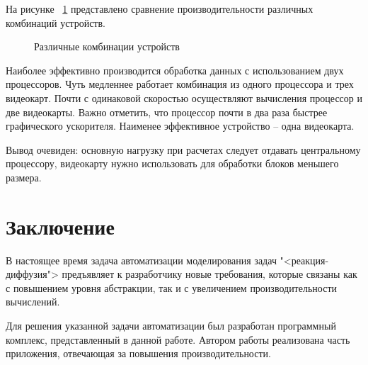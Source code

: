 \documentclass[a4paper, 14pt]{extarticle}
\theoremstyle{definition}
\begin{document}
\par На рисунке ~\ref{ris:hist} представлено сравнение производительности различных комбинаций устройств.
\begin{figure}[h]
	\caption{Различные комбинации устройств}
	\label{ris:hist}
\end{figure}

\par Наиболее эффективно производится обработка данных с использованием двух процессоров. Чуть медленнее работает комбинация из одного процессора и трех видеокарт. Почти с одинаковой скоростью осуществляют вычисления процессор и две видеокарты. Важно отметить, что процессор почти в два раза быстрее графического ускорителя. Наименее эффективное устройство -- одна видеокарта.

\par Вывод очевиден: основную нагрузку при расчетах следует отдавать центральному процессору, видеокарту нужно использовать для обработки блоков меньшего размера.



\section*{Заключение}

\par В настоящее время задача автоматизации моделирования задач "<реакция-диффузия"> предъявляет к разработчику новые требования, которые связаны как с повышением уровня абстракции, так и с увеличением производительности вычислений.

\par Для решения указанной задачи автоматизации был разработан программный комплекс, представленный в данной работе. Автором работы реализована часть приложения, отвечающая за повышения производительности.
\end{document}
